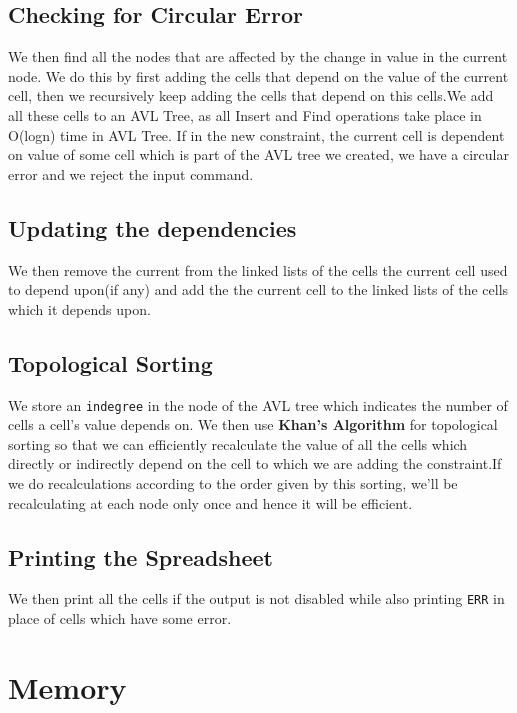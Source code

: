 \documentclass{article}
\begin{document}
\subsection{Checking for Circular Error}
We then find all the nodes that are affected by the change in value in the current node. We do this by first adding the cells that depend on the value of the current cell, then we recursively keep adding the cells that depend on this cells.We add all these cells to an AVL Tree, as all Insert and Find operations take place in O(logn) time in AVL Tree.
If in the new constraint, the current cell is dependent on value of some cell which is part of the AVL tree we created, we have a circular error and we reject the input command. 

\subsection{Updating the dependencies}
We then remove the current from the linked lists of the cells the current cell used to depend upon(if any) and add the the current cell to the linked lists of the cells which it depends upon.

\subsection{Topological Sorting}
We store an \texttt{indegree} in the node of the AVL tree which indicates the number of cells a cell's value depends on. We then use \textbf{Khan's Algorithm}
for topological sorting so that we can efficiently recalculate the value of all the cells which directly or indirectly depend on the cell to which we are adding the constraint.If we do recalculations according to the order given by this sorting, we'll be recalculating at each node only once and hence it will be efficient.

\subsection{Printing the Spreadsheet}
We then print all the cells if the output is not disabled while also printing \texttt{ERR} in place of cells which have some error.

\section{Memory}
\end{document}
